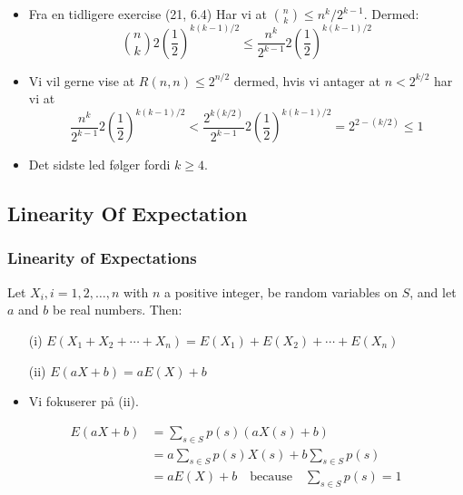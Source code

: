 \documentclass{beamer}
\begin{document}
\begin{frame}[allowframebreaks]
\begin{itemize}
\item Fra en tidligere exercise (21, 6.4) Har vi at $\binom{n}{k} \leq n^{k}/2^{k-1}$. Dermed: \[ \binom{n}{k} 2 \left( \frac{1}{2} \right)^{k(k-1)/2} \leq \frac{n^{k}}{2^{k-1}}2 \left( \frac{1}{2} \right)^{k(k-1)/2}\]
\item Vi vil gerne vise at $R(n,n) \leq 2^{n/2}$ dermed, hvis vi antager at $n < 2^{k/2}$ har vi at \[ \frac{n^{k}}{2^{k-1}}2 \left( \frac{1}{2} \right)^{k(k-1)/2} < \frac{2^{k(k/2)}}{2^{k-1}}2 \left( \frac{1}{2} \right)^{k(k-1)/2} = 2^{2-(k/2)} \leq 1 \]
\item Det sidste led følger fordi $k \geq 4$.
\end{itemize}
\end{frame}

\subsection{Linearity Of Expectation}
\label{subsec:label}

\begin{frame}[allowframebreaks]
  \frametitle{Linearity of Expectations}
  \begin{theorem}[3]
    Let \(X_{i}, i = 1, 2, \ldots, n\) with \(n\) a positive integer, be random variables on \(S\), and let \(a\) and \(b\) be real numbers. Then:
    \begin{itemize}
      \item[(i)] \(E(X_{1}+X_{2}+\cdots+X_{n}) = E(X_{1}) + E(X_{2}) + \cdots + E(X_{n})\)
      \item[(ii)] \(E(aX+b) = aE(X)+b\)
    \end{itemize}
  \end{theorem}
  \begin{itemize}
    \item Vi fokuserer på (ii).
  \end{itemize}

  \begin{equation}
    \begin{split}
      E(aX  + b) &= \sum_{s \in S} p(s)(aX(s)+b)\\
                 &= a \sum_{s \in S} p(s)X(s) + b \sum_{s \in S} p(s) \\
                 &= aE(X)+b \quad \text{because} \quad \sum_{s \in S} p(s) = 1\\
    \end{split}
  \end{equation}
\end{frame}
\end{document}
